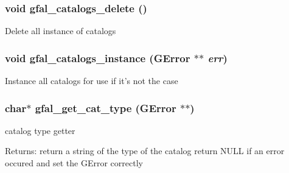 \subsubsection{\setlength{\rightskip}{0pt plus 5cm}void gfal\_\-catalogs\_\-delete ()}\label{gfal__common__catalog_8c_9f817ca6f7bb780c77909f76319c572e}


Delete all instance of catalogs 
\subsubsection{\setlength{\rightskip}{0pt plus 5cm}void gfal\_\-catalogs\_\-instance (GError $\ast$$\ast$ {\em err})}\label{gfal__common__catalog_8c_af8b36fa0faae6da2763a4926653f30b}


Instance all catalogs for use if it's not the case 
\subsubsection{\setlength{\rightskip}{0pt plus 5cm}char$\ast$ gfal\_\-get\_\-cat\_\-type (GError $\ast$$\ast$)}\label{gfal__common__catalog_8c_c20aa1a376c802d0c60208854537851e}


catalog type getter 

\begin{Desc}
\item[Returns:]return a string of the type of the catalog return NULL if an error occured and set the GError correctly \end{Desc}
